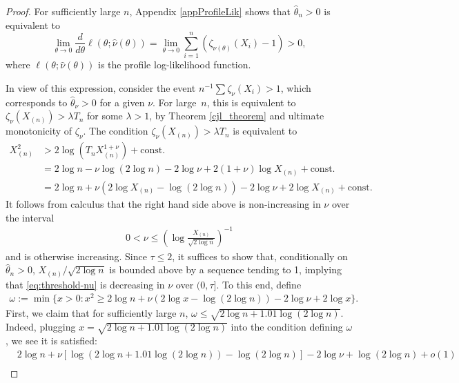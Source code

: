 \documentclass[11pt]{article}
\theoremstyle{definition}
\def\Xmax{X_{(n)}}
\begin{document}
\begin{proof}
	
	
	For sufficiently large $n$, Appendix \ref{appProfileLik} shows that $\hat\theta_n>0$ is equivalent to
	\begin{equation}\label{eqProfileLikDeriv}
	\lim_{\theta\rightarrow 0}\frac{d}{d\theta}\ell(\theta; \hat\nu(\theta))  = \lim_{\theta\rightarrow 0} \sum_{i=1}^{n}(\zeta_{\hat\nu(\theta)}(X_i)-1)  > 0,
	\end{equation}
	where $\ell(\theta; \hat\nu(\theta))$ is the profile log-likelihood function. 
	
	In view of this expression, consider the event $n^{-1}\sum\zeta_\nu(X_i)  > 1$, which corresponds to $\hat\theta_\nu > 0$ for a given $\nu$. For large~$n$, this is equivalent to $\zeta_\nu(\Xmax) > \lambda T_n$ for some $\lambda > 1$, by Theorem \ref{cjl_theorem} and ultimate monotonicity of $\zeta_{\nu}$. The condition $\zeta_\nu(X_{(n)})>\lambda T_n$ is equivalent to
	\begin{align}
	\nonumber
	X^2_{(n)}  &> 2\log (T_n X_{(n)}^{1+\nu}) + \text{const.} \\
	\nonumber
	&= 2 \log n - \nu \log (2\log n) -2 \log \nu + 2(1+\nu) \log X_{(n)} + \text{const.} \\
	\label{eq:threshold-nu}
	&= 2\log n + \nu (2\log X_{(n)} - \log (2\log n)) - 2\log \nu + 2\log X_{(n)} + \text{const.}
	\end{align}
	It follows from calculus that the right hand side above is non-increasing in $\nu$ over the interval
	\begin{align}
	\label{eq:nu-decreasing-upper}
	0< \nu \leq \left(\log \frac{X_{(n)}}{\sqrt{2\log n}}\right)^{-1}
	\end{align}
	and is otherwise increasing. Since $\tau\leq 2$, it suffices to show that, conditionally on $\hat{\theta}_n>0$, $X_{(n)}/\sqrt{2\log n}$ is bounded above by a sequence tending to 1, implying that \eqref{eq:threshold-nu} is decreasing in $\nu$ over $(0,\tau]$. To this end, define
	\begin{align*}
	\omega := \min\{x>0:x^2 \geq 2\log n + \nu(2\log x-\log(2\log n)) - 2\log\nu + 2\log x \}.
	\end{align*}
	First, we claim that for sufficiently large $n$, $\omega \leq \sqrt{2\log n + 1.01 \log (2\log n)}$. Indeed, plugging $x= \sqrt{2\log n + 1.01 \log (2\log n)}$ into the condition defining $\omega$, we see it is satisfied:
	\begin{align*}
	&2\log n + \nu [\log(2\log n + 1.01\log(2\log n)) - \log(2\log n)] - 2\log \nu + \log (2\log n) + o(1) \\

\end{align*}
\end{proof}
\end{document}
